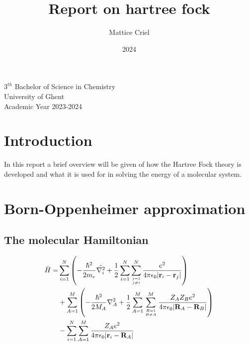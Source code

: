 \documentclass[letterpaper, 11pt]{article}
\title{Report on hartree fock}
\author{Mattice Criel }
\date{2024}
\numberwithin{equation}{section}
\numberwithin{table}{section}
\numberwithin{figure}{section}
\begin{document}
\maketitle

\begin{center}
    $3^{th}$ Bachelor of Science in Chemistry\\
    University of Ghent\\
    Academic Year 2023-2024
\end{center}

\section{Introduction}
In this report a brief overview will be given of how the Hartree Fock theory is developed and what it is used for in solving the energy of a molecular system.

\section{Born-Oppenheimer approximation}
\subsection{The molecular Hamiltonian}
\begin{equation}
    \begin{split}
        \hat{H} = & \sum_{i=1}^{N} \left( -\frac{\hbar^2}{2m_e} \hat{\nabla_i^2} + \frac{1}{2} \sum_{i=1}^{N} \sum_{j=1 \atop j \neq i}^{N} \frac{e^2}{4\pi\epsilon_0|\mathbf{r}_i - \mathbf{r}_j|} \right) \\
        & + \sum_{A=1}^{M} \left( -\frac{\hbar^2}{2M_A} \nabla_A^2 + \frac{1}{2} \sum_{A=1}^{M} \sum_{B=1 \atop B \neq A}^{M} \frac{Z_A Z_B e^2}{4\pi\epsilon_0|\mathbf{R}_A - \mathbf{R}_B|} \right) \\
        & - \sum_{i=1}^{N} \sum_{A=1}^{M} \frac{Z_A e^2}{4\pi\epsilon_0|\mathbf{r}_i - \mathbf{R}_A|}
    \end{split}
    \end{equation}
    
\end{document}
